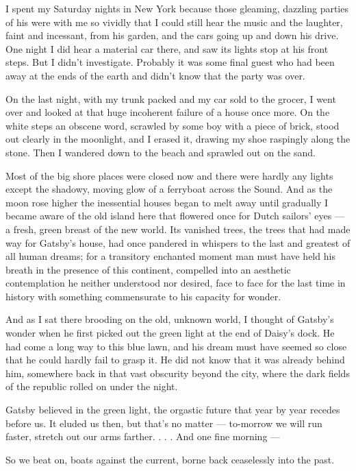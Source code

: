 \documentclass{znotebook}
\begin{document}
I spent my Saturday nights in New York because those gleaming, dazzling parties of his were with me so vividly that I could still hear the music and the laughter, faint and incessant, from his garden, and the cars going up and down his drive. One night I did hear a material car there, and saw its lights stop at his front steps. But I didn't investigate. Probably it was some final guest who had been away at the ends of the earth and didn't know that the party was over.

On the last night, with my trunk packed and my car sold to the grocer, I went over and looked at that huge incoherent failure of a house once more. On the white steps an obscene word, scrawled by some boy with a piece of brick, stood out clearly in the moonlight, and I erased it, drawing my shoe raspingly along the stone. Then I wandered down to the beach and sprawled out on the sand.

Most of the big shore places were closed now and there were hardly any lights except the shadowy, moving glow of a ferryboat across the Sound. And as the moon rose higher the inessential houses began to melt away until gradually I became aware of the old island here that flowered once for Dutch sailors' eyes ---{} a fresh, green breast of the new world. Its vanished trees, the trees that had made way for Gatsby's house, had once pandered in whispers to the last and greatest of all human dreams; for a transitory enchanted moment man must have held his breath in the presence of this continent, compelled into an aesthetic contemplation he neither understood nor desired, face to face for the last time in history with something commensurate to his capacity for wonder.

And as I sat there brooding on the old, unknown world, I thought of Gatsby's wonder when he first picked out the green light at the end of Daisy's dock. He had come a long way to this blue lawn, and his dream must have seemed so close that he could hardly fail to grasp it. He did not know that it was already behind him, somewhere back in that vast obscurity beyond the city, where the dark fields of the republic rolled on under the night.

Gatsby believed in the green light, the orgastic future that year by year recedes before us. It eluded us then, but that's no matter ---{} to-morrow we will run faster, stretch out our arms farther. . . . And one fine morning ---

So we beat on, boats against the current, borne back ceaselessly into the past.
\end{document}
